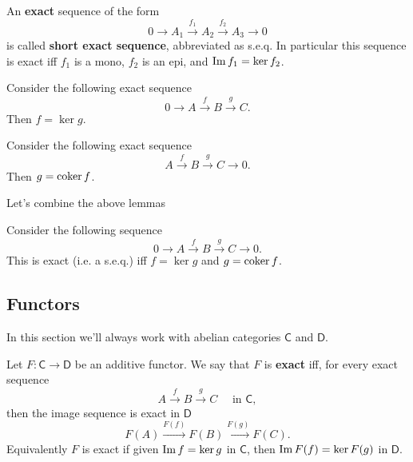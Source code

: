 \begin{defn}
	An \textbf{exact} sequence of the form
	\begin{equation}
	0 \to A_1 \xrightarrow{f_1} A_2 \xrightarrow{f_2} A_3 \to 0 
	\end{equation} 
	is called \textbf{short exact sequence}, abbreviated as s.e.q.
	In particular this sequence is exact iff
	$f_1$ is a mono, $f_2$ is an epi, and $\operatorname{Im} f_1 = \ker f_2$.
\end{defn}

\begin{lem}
	Consider the following exact sequence
	\begin{equation}
	0 \to A \xrightarrow{f} B \xrightarrow{g} C
	.\end{equation} 
	Then $f = \ker g$.
\end{lem} 

\begin{lem}
	Consider the following exact sequence
	\begin{equation}
	A \xrightarrow{f} B \xrightarrow{g} C \to 0
	.\end{equation} 
	Then $g = \operatorname{coker} f$.
\end{lem} 
Let's combine the above lemmas

\begin{prop}
	Consider the following sequence
	\begin{equation}
	0 \to A \xrightarrow{f} B \xrightarrow{g} C \to 0
	.\end{equation} 
	This is exact (i.e. a s.e.q.) iff $f = \ker g$ and $g = \operatorname{coker} f$.
\end{prop} 

\subsection{Functors}
In this section we'll always work with abelian categories $\mathsf{C}$ and $\mathsf{D}$.

\begin{defn}
	Let $F: \mathsf{C} \to \mathsf{D}$ be an additive functor.
	We say that $F$ is \textbf{exact} iff, for every exact sequence
	\begin{equation}
	A \xrightarrow{f} B \xrightarrow{g} C \quad \text{ in } \mathsf{C}
	,\end{equation} 
	then the image sequence is exact in $\mathsf{D}$ 
	\begin{equation}
	F(A) \xrightarrow{F(f)} F(B) \xrightarrow{F(g)} F(C)
	.\end{equation} 
	Equivalently $F$ is exact if given $\operatorname{Im} f = \ker g$ in $\mathsf{C}$, then
	$\operatorname{Im} F(f) = \ker F(g)$ in $\mathsf{D}$.
\end{defn}

